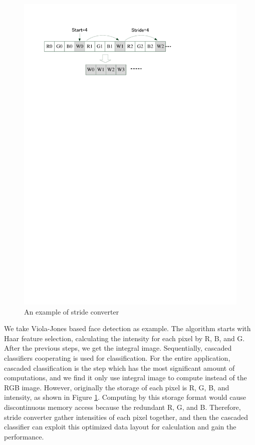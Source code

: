 \documentclass[10pt,journal,compsoc]{IEEEtran}
\begin{document}
\begin{figure}[tpb]
\begin{center}
\graphicspath{{picture/}}
\includegraphics[scale=0.6]{stride}
\caption{An example of stride converter}
\label{fig:Stride}
\end{center}
\end{figure}


We take Viola-Jones based face detection \cite{facedetection} as example. The algorithm starts with Haar feature selection,
 calculating the intensity for each pixel by R, B, and G.
After the previous steps, we get the integral image. Sequentially, cascaded classifiers cooperating is used for classification. For the entire application, cascaded classification is the step which has the most significant amount of computations, and we find it only use integral image to compute instead of the RGB image. However, originally the storage of each pixel is R, G, B, and intensity, as shown in Figure \ref{fig:Stride}. Computing by this storage format would cause discontinuous memory access because the redundant R, G, and B. Therefore, stride converter gather intensities of each pixel together, and then the cascaded classifier can exploit this optimized data layout for calculation and gain the performance.
\end{document}
